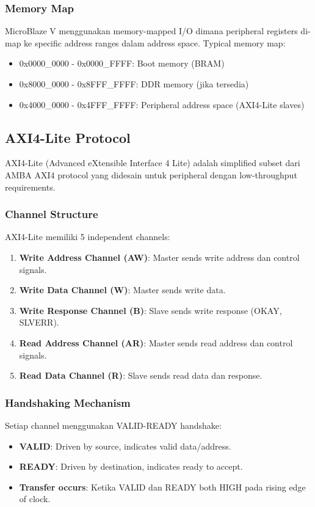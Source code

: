 \subsubsection{Memory Map}

MicroBlaze V menggunakan memory-mapped I/O dimana peripheral registers di-map ke specific address ranges dalam address space. Typical memory map:
\begin{itemize}
	\item 0x0000\_0000 - 0x0000\_FFFF: Boot memory (BRAM)
	\item 0x8000\_0000 - 0x8FFF\_FFFF: DDR memory (jika tersedia)
	\item 0x4000\_0000 - 0x4FFF\_FFFF: Peripheral address space (AXI4-Lite slaves)
\end{itemize}

\subsection{AXI4-Lite Protocol}

AXI4-Lite (Advanced eXtensible Interface 4 Lite) adalah simplified subset dari AMBA AXI4 protocol yang didesain untuk peripheral dengan low-throughput requirements.

\subsubsection{Channel Structure}

AXI4-Lite memiliki 5 independent channels:
\begin{enumerate}
	\item \textbf{Write Address Channel (AW)}: Master sends write address dan control signals.
	\item \textbf{Write Data Channel (W)}: Master sends write data.
	\item \textbf{Write Response Channel (B)}: Slave sends write response (OKAY, SLVERR).
	\item \textbf{Read Address Channel (AR)}: Master sends read address dan control signals.
	\item \textbf{Read Data Channel (R)}: Slave sends read data dan response.
\end{enumerate}

\subsubsection{Handshaking Mechanism}

Setiap channel menggunakan VALID-READY handshake:
\begin{itemize}
	\item \textbf{VALID}: Driven by source, indicates valid data/address.
	\item \textbf{READY}: Driven by destination, indicates ready to accept.
	\item \textbf{Transfer occurs}: Ketika VALID dan READY both HIGH pada rising edge of clock.
\end{itemize}

